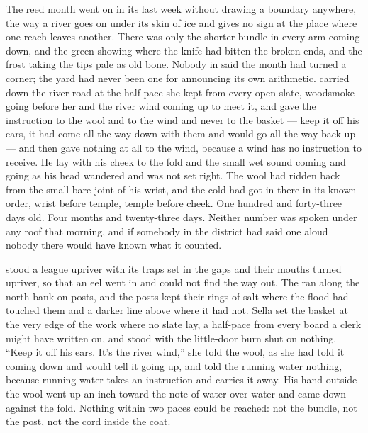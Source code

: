 
The reed month went on in its last week without drawing a boundary anywhere, the way a river goes on under its skin of ice and gives no sign at the place where one reach leaves another. There was only the shorter bundle in every arm coming down, and the green showing where the knife had bitten the broken ends, and the frost taking the tips pale as old bone. Nobody in  said the month had turned a corner; the yard had never been one for announcing its own arithmetic.  carried  down the river road at the half-pace she kept from every open slate, woodsmoke going before her and the river wind coming up to meet it, and gave the instruction to the wool and to the wind and never to the basket --- keep it off his ears, it had come all the way down with them and would go all the way back up --- and then gave nothing at all to the wind, because a wind has no instruction to receive. He lay with his cheek to the fold and the small wet sound coming and going as his head wandered and was not set right. The wool had ridden back from the small bare joint of his wrist, and the cold had got in there in its known order, wrist before temple, temple before cheek. One hundred and forty-three days old. Four months and twenty-three days. Neither number was spoken under any roof that morning, and if somebody in the district had said one aloud nobody there would have known what it counted.

 stood a league upriver with its traps set in the gaps and their mouths turned upriver, so that an eel went in and could not find the way out. The  ran along the north bank on posts, and the posts kept their rings of salt where the flood had touched them and a darker line above where it had not. Sella set the basket at the very edge of the work where no slate lay, a half-pace from every board a clerk might have written on, and stood with the little-door burn shut on nothing. “Keep it off his ears. It's the river wind,” she told the wool, as she had told it coming down and would tell it going up, and told the running water nothing, because running water takes an instruction and carries it away. His hand outside the wool went up an inch toward the note of water over water and came down against the fold. Nothing within two paces could be reached: not the bundle, not the post, not the cord inside the coat.

